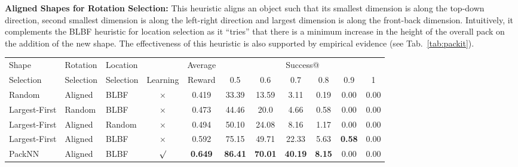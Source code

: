 \documentclass{article}
\begin{document}
\noindent\textbf{Aligned Shapes for Rotation Selection: }This heuristic aligns an object such that its smallest dimension is along the top-down direction, second smallest dimension is along the left-right direction and largest dimension is along the front-back dimension. Intuitively, it complements the BLBF heuristic for location selection as it ``tries'' that there is a minimum increase in the height of the overall pack on the addition of the new shape. The effectiveness of this heuristic is also supported by empirical evidence (see Tab.~\ref{tab:packit}).
\begin{table*}[t]
    \centering
    \begin{center}
    \begin{tabular}{lll|c||c|cccccc}
    \hline
    Shape  & Rotation  & Location & & Average & \multicolumn{6}{c}{Success@}  \\
     Selection & Selection & Selection & Learning & Reward & 0.5 & 0.6 & 0.7 & 0.8 & 0.9 & 1\\
     \hline \hline
     Random        & Aligned & BLBF & $\times$   & 0.419 & 33.39 & 13.59 & 3.11  & 0.19 & 0.00 & 0.00 \\
     Largest-First & Random  & BLBF & $\times$   & 0.473 & 44.46 & 20.0  & 4.66  & 0.58 & 0.00 & 0.00 \\
      Largest-First & Aligned & Random & $\times$ & 0.494 & 50.10 & 24.08 & 8.16  & 1.17 & 0.00 & 0.00 \\
     Largest-First & Aligned & BLBF & $\times$   & 0.592 & 75.15 & 49.71 & 22.33 & 5.63 & \textbf{0.58} & 0.00 \\
     PackNN        & Aligned & BLBF & $\surd$    & \textbf{0.649}  & \textbf{86.41}  & \textbf{70.01}  & \textbf{40.19}  & \textbf{8.15} & 0.00 & 0.00 \\
    \hline
    \end{tabular}
    \end{center}
    \caption{Performance of various model-free baselines on the PackIt environment. Leaning-based model outperforms a heuristic-based one indicating learning could be a viable option to acquire geometric planning skills for packing.}
    \label{tab:packit}
\end{table*}
\end{document}
